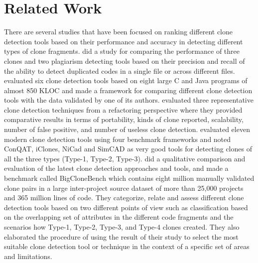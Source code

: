 \documentclass[review]{elsarticle}
\begin{document}
\vspace{2mm}
\section{Related Work}
\label{the-related-works}
There are several studies \citep{jeff-evaluating, Roy09comparisonand, 4288192Comparison, ScenarioBasedComparison} that have been focused on ranking different clone detection tools based on their performance and accuracy in detecting different types of clone fragments. \citet{BaileyBurdComparison} did a study for comparing the performance of three clones and two plagiarism detecting tools based on their precision and recall of the ability to detect duplicated codes in a single file or across different files.  \citet{4288192Comparison} evaluated six clone detection tools based on eight large C and Java programs of almost 850 KLOC and made a framework for comparing different clone detection tools with the data validated by one of its authors.  \citet{EvaluateRefactoring} evaluated three representative clone detection techniques from a refactoring perspective where they provided comparative results in terms of portability, kinds of clone reported, scalability, number of false positive, and number of useless clone detection.   \citet{jeff-evaluating} evaluated eleven modern clone detection tools using four benchmark frameworks and noted ConQAT, iClones, NiCad and SimCAD as very good tools for detecting clones of all the three types (Type-1, Type-2, Type-3). \citet{Roy09comparisonand} did a qualitative comparison and evaluation of the latest clone detection approaches and tools, and made a benchmark called BigCloneBench \citep{BigCloneBenchCKRoyJRCordy} which contains eight million manually validated clone pairs in a large inter-project source dataset of more than 25,000 projects and 365 million lines of code. They categorize, relate and assess different clone detection tools based on two different points of view such as classification based on the overlapping set of attributes in the different code fragments and the scenarios how Type-1, Type-2, Type-3, and Type-4 clones created. They also elaborated the procedure of using the result of their study to select the most suitable clone detection tool or technique in the context of a specific set of areas and limitations. \\
\end{document}
